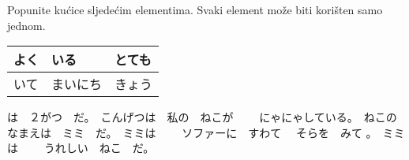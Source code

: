 	\vspace{10pt}
	
	\begin{mondai}{Popunite kućice sljedećim elementima. Svaki element može biti korišten samo jednom. }

		\item 
	\begin{tabular}{|l|l|l|}
		\hline
		よく&いる&とても\\\hline
		いて&まいにち&きょう\\\hline
	\end{tabular}

	\end{mondai}



	\begin{bunshou}
		\framebox{ \begin{minipage}{0.4in}\hfill\vspace{0.3in}\end{minipage} }\vspace{10pt}は　２がつ　だ。　こんげつは　私の　ねこが　
		\framebox{ \begin{minipage}{0.4in}\hfill\vspace{0.3in}\end{minipage} }\vspace{10pt}
		　にゃにゃしている。　ねこの　なまえは　ミミ　だ。　ミミは　
		\framebox{ \begin{minipage}{0.4in}\hfill\vspace{0.3in}\end{minipage} }\vspace{10pt}　ソファーに　すわて
		\framebox{ \begin{minipage}{0.4in}\hfill\vspace{0.3in}\end{minipage} }\vspace{10pt}　そらを　みて
		\framebox{ \begin{minipage}{0.4in}\hfill\vspace{0.3in}\end{minipage} }\vspace{10pt}。　ミミは　
		\framebox{ \begin{minipage}{0.4in}\hfill\vspace{0.3in}\end{minipage} }\vspace{10pt}　うれしい　ねこ　だ。
	\end{bunshou}
	